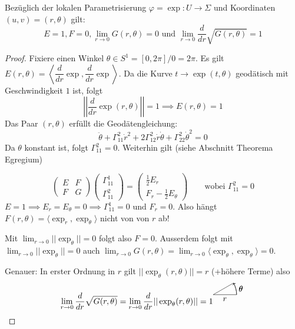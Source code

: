 \documentclass[../main.tex]{subfiles}
\begin{document}
\begin{proposition}
    Bezüglich der lokalen Parametrisierung $\varphi = \exp : U \to \Sigma$
    und Koordinaten $(u,v) = (r, \theta)$ gilt: $$E=1, F=0,\lim_{r \to 0} G(r,\theta)=0
    \text{ und } \lim_{r \to 0} \frac{d}{dr}\sqrt{G(r,\theta)} = 1$$

\end{proposition}

\begin{proof}
    Fixiere einen Winkel $\theta \in S^1 = [0,2\pi] / 0 = 2\pi$.
    Es gilt $E(r,\theta) = \left \langle \dfrac{d}{dr} \exp, \dfrac{d}{dr}\exp \right\rangle$.
    Da die Kurve $ t \to \exp (t, \theta)$ geodätisch mit Geschwindigkeit $1$ ist,
    folgt $$\left|\left| \frac{d}{dr}\exp (r, \theta)\right|\right| = 1 \implies E(r,\theta)=1$$
    Das Paar $(r, \theta)$ erfüllt die Geodätengleichung:
    $$
        \ddot{\theta} + \Gamma^2_{11}\dot{r}^2 + 2 \Gamma^2_{12}\dot{r}\dot{\theta} + \Gamma^2_{22}\dot{\theta}^2 = 0 
    $$
    Da $\theta$ konstant ist, folgt $\Gamma^2_{11}=0$. Weiterhin gilt (siehe Abschnitt Theorema Egregium)

    $$
    \begin{pmatrix}
        E & F \\ F & G
    \end{pmatrix}
    \begin{pmatrix}
        \Gamma^1_{11} \\ \Gamma^2_{11} %
    \end{pmatrix} = 
    \begin{pmatrix}
        \frac{1}{2}E_r \\ F_r - \frac{1}{2}E_{\theta}
    \end{pmatrix} \qquad \text{wobei }\Gamma^2_{11}=0
    $$$ E = 1 \implies E_r = E_{\theta} = 0 \implies \Gamma^1_{11}=0 \text{ und } F_r =0$.
    Also hängt $F(r,\theta) = \langle \exp _r, \exp _{\theta} \rangle$
    nicht von von $r$ ab!

    Mit $\lim_{r \to 0} ||\exp _{\theta} || = 0 $ folgt also $F = 0$.    
    Ausserdem folgt mit $\lim_{r \to 0} ||\exp _{\theta}|| = 0$ auch 
    $\lim_{r \to 0} G(r,\theta) = \lim_{r \to 0} \langle \exp _{\theta}, \exp _{\theta} \rangle = 0$.

    Genauer: In erster Ordnung in $r$ gilt $||\exp_{\theta}(r,\theta)|| = r$ (+höhere Terme)
    also $$\lim_{r \to 0} \frac{d}{dr}\sqrt{G(r,\theta)} = \lim_{r \to 0} \frac{d}{dr} ||\exp_{\theta}(r,\theta)|| =1
    \begin{tikzpicture}
        \draw (0,0) -- (1,0)
            node[midway, below] {$r$};
        \draw (0,0) -- (0.866,0.5);
        \draw[->] (1,0) arc (0:30:1 and 1)
            node[midway, right] {$\theta$};
            \draw[->] (1,0) arc (0:30:1 and 1)
            node[midway, right] {$\theta$};
    \end{tikzpicture}$$
\end{proof}
\end{document}
